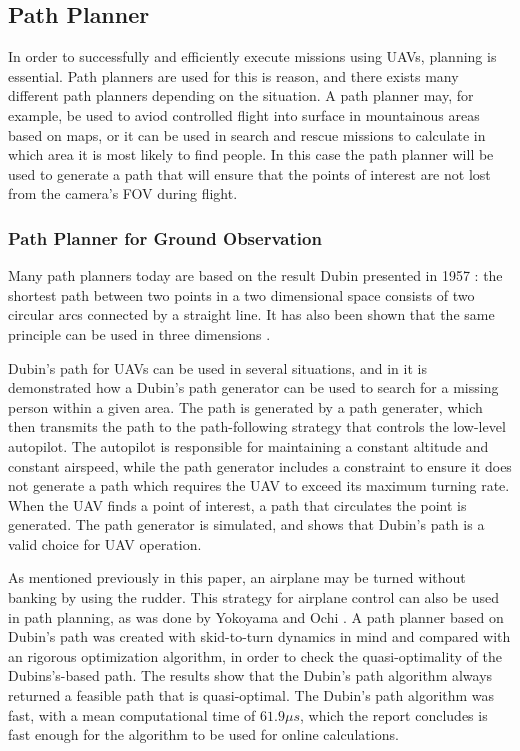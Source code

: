 \subsection{Path Planner}

In order to successfully and efficiently execute missions using UAVs, planning is essential. Path planners are used for this is reason, and there exists many different path planners depending on the situation. A path planner may, for example, be used to aviod controlled flight into surface in mountainous areas based on maps, or it can be used in search and rescue missions to calculate in which area it is most likely to find people. In this case the path planner will be used to generate a path that will ensure that the points of interest are not lost from the camera's FOV during flight.


\subsubsection{Path Planner for Ground Observation}
\label{ch:path_literature}
Many path planners today are based on the result Dubin presented in 1957 \cite{DUBIN}: the shortest path between two points in a two dimensional space consists of two circular arcs connected by a straight line. It has also been shown that the same principle can be used in three dimensions \cite{dubinsBEARD}. 

Dubin's path for UAVs can be used in several situations, and in \cite{dubinFixedWingLUGO} it is demonstrated how a Dubin's path generator can be used to search for a missing person within a given area. The path is generated by a path generater, which then transmits the path to the path-following strategy that controls the low-level autopilot. The autopilot is responsible for maintaining a constant altitude and constant airspeed, while the path generator includes a constraint to ensure it does not generate a path which requires the UAV to exceed its maximum turning rate. When the UAV finds a point of interest, a path that circulates the point is generated. The path generator is simulated, and shows that Dubin's path is a valid choice for UAV operation.

As mentioned previously in this paper, an airplane may be turned without banking by using the rudder. This strategy for airplane control can also be used in path planning, as was done by Yokoyama and Ochi \cite{skidPathYOKO}. A path planner based on Dubin's path was created with skid-to-turn dynamics in mind and compared with an rigorous optimization algorithm, in order to check the quasi-optimality of the Dubins's-based path. The results show that the Dubin's path algorithm always returned a feasible path that is quasi-optimal. The Dubin's path algorithm was fast, with a mean computational time of $61.9\mu s$, which the report concludes is fast enough for the algorithm to be used for online calculations.